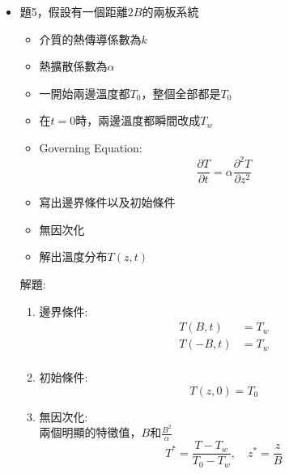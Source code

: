 \documentclass[../main.tex]{subfiles}
\begin{document}
\begin{itemize}
\begin{enumerate}
\begin{align}
      \right] \left(-\frac{CB^2}{\mu}\right) \nonumber\\
          &= \frac{-CB^2 \xi}{\mu} \left[
        1 - \frac{\cosh\left(\frac{y}{\sqrt{K}}\right)}{\cosh\left(\frac{B}{\sqrt{K}}\right)}
      \right] \nonumber\\
          &= \frac{-CB^2}{\mu} \left(-\delta^{\ast 2}\right) \left[
        1 - \frac{\cosh\left(\frac{y}{\sqrt{K}}\right)}{\cosh\left(\frac{B}{\sqrt{K}}\right)}
      \right] \nonumber\\
          &= \boxed{\frac{C K}{\mu} \left[
        1 - \frac{\cosh\left(\frac{y}{\sqrt{K}}\right)}{\cosh\left(\frac{B}{\sqrt{K}}\right)}
      \right]}
    \end{align}
  \end{enumerate}
  \item 題5，假設有一個距離$2B$的兩板系統
  \begin{itemize}
    \item 介質的熱傳導係數為$k$
    \item 熱擴散係數為$\alpha$
    \item 一開始兩邊溫度都$T_0$，整個全部都是$T_0$
    \item 在$t=0$時，兩邊溫度都瞬間改成$T_w$
    \item Governing Equation:
    \begin{equation}
      \frac{\partial T}{\partial t} = \alpha \frac{\partial^2 T}{\partial z^2}
    \end{equation}
    \item 寫出邊界條件以及初始條件
    \item 無因次化
    \item 解出溫度分布$T(z,t)$
  \end{itemize}
  解題:
  \begin{enumerate}
    \item 邊界條件:
    \begin{align}
      T(B,t) &= T_w\\
      T(-B,t) &= T_w\\
    \end{align}
    \item 初始條件:
    \begin{equation}
      T(z,0) = T_0
    \end{equation}
    \item 無因次化:\\
    兩個明顯的特徵值，$B$和$\frac{B^2}{\alpha}$
    \begin{equation}
      T^\ast = \frac{T - T_w}{T_0 - T_w},\quad z^\ast = \frac{z}{B}

\end{equation}
\end{enumerate}
\end{itemize}
\end{document}
